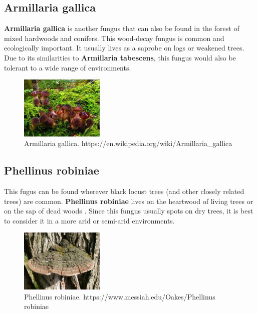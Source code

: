 \documentclass[12pt]{article}
\begin{document}
\subsection{Armillaria gallica}
\textbf{Armillaria gallica} is another fungus that can also be found in the forest of mixed hardwoods and conifers. This wood-decay fungus is common and ecologically important. It usually lives as a saprobe on logs or weakened trees. Due to its similarities to \textbf{Armillaria tabescens}, this fungus would also be tolerant to a wide range of environments.

\begin{figure}[h!]
\begin{center}
\includegraphics[width=4cm]{gallica.jpg}
\caption{Armillaria gallica. \centering https://en.wikipedia.org/wiki/Armillaria\_gallica}
\end{center}
\end{figure}

\subsection{Phellinus robiniae}
This fugus can be found wherever black locust trees (and other closely related trees) are common. \textbf{Phellinus robiniae} lives on the heartwood of living trees or on the sap of dead woods \cite{robin}. Since this fungus usually spots on dry trees, it is best to consider it in a more arid or semi-arid environments. 

\begin{figure}[h!]
\begin{center}
\includegraphics[width=4cm]{robin.jpg}
\caption{Phellinus robiniae. \centering 
https://www.messiah.edu/Oakes/Phellinus robiniae}
\end{center}
\end{figure}
\end{document}
